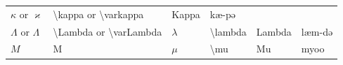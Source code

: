 \documentclass[
]{book}
\begin{document}
\begin{longtable}[]{@{}llllll@{}}
\begin{minipage}[t]{0.18\columnwidth}
\(\kappa\) or \(\varkappa\)\strut
\end{minipage} & \begin{minipage}[t]{0.17\columnwidth}\raggedright
\textbackslash kappa or \textbackslash varkappa\strut
\end{minipage} & \begin{minipage}[t]{0.06\columnwidth}\raggedright
Kappa\strut
\end{minipage} & \begin{minipage}[t]{0.08\columnwidth}\raggedright
kæ-pə\strut
\end{minipage}\tabularnewline
\begin{minipage}[t]{0.18\columnwidth}\raggedright
\(\Lambda\) or \(\varLambda\)\strut
\end{minipage} & \begin{minipage}[t]{0.17\columnwidth}\raggedright
\textbackslash Lambda or \textbackslash varLambda\strut
\end{minipage} & \begin{minipage}[t]{0.18\columnwidth}\raggedright
\(\lambda\)\strut
\end{minipage} & \begin{minipage}[t]{0.17\columnwidth}\raggedright
\textbackslash lambda\strut
\end{minipage} & \begin{minipage}[t]{0.06\columnwidth}\raggedright
Lambda\strut
\end{minipage} & \begin{minipage}[t]{0.08\columnwidth}\raggedright
læm-də\strut
\end{minipage}\tabularnewline
\begin{minipage}[t]{0.18\columnwidth}\raggedright
\(M\)\strut
\end{minipage} & \begin{minipage}[t]{0.17\columnwidth}\raggedright
M\strut
\end{minipage} & \begin{minipage}[t]{0.18\columnwidth}\raggedright
\(\mu\)\strut
\end{minipage} & \begin{minipage}[t]{0.17\columnwidth}\raggedright
\textbackslash mu\strut
\end{minipage} & \begin{minipage}[t]{0.06\columnwidth}\raggedright
Mu\strut
\end{minipage} & \begin{minipage}[t]{0.08\columnwidth}\raggedright
myoo\strut
\end{minipage}\tabularnewline

\end{longtable}
\end{document}
